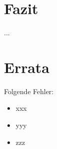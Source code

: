 \documentclass[12pt,fleqn,parskip=half,twoside,toc=index,headings=small,a4paper]{scrreprt}
\begin{document}
\chapter{Fazit}
...
\chapter{Errata}
	Folgende Fehler:
	\begin{itemize}
		\item xxx
		\item yyy
		\item zzz
	\end{itemize}
\end{document}
